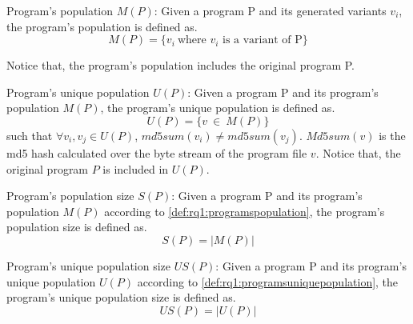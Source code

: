 
\begin{definition}{Program's population $M(P)$:}\label{def:rq1:programspopulation}
    Given a program P and its generated variants $v_i$, the program's population is defined as.\\
    $$
        M(P)=\{v_i\ \text{where $v_i$ is a variant of P}\}
    $$

    Notice that, the program's population includes the original program P.
\end{definition}




\begin{definition}{Program's unique population $U(P)$:}\label{def:rq1:programsuniquepopulation}
    Given a program P and its program's population $M(P)$, the program's unique population is defined as.\\
    $$
        U(P)=\{v\ \in\ M(P)\}
    $$
    such that $\forall v_i,v_j \in U(P)$, $md5sum(v_i) \neq md5sum(v_j)$.
    $Md5sum(v)$ is the md5 hash calculated over the byte stream of the program file $v$. Notice that, the original program $P$ is included in $U(P)$.

\end{definition}

\begin{metric}{Program's population size $S(P)$:}\label{metric:rq1:PS}
    Given a program P and its program's population $M(P)$ according to \autoref{def:rq1:programspopulation}, the program's population size is defined as.\\
    $$
        S(P)=|M(P)|
    $$
\end{metric}


\begin{metric}{Program's unique population size $US(P)$:}\label{metric:rq1:UP}
    Given a program P and its program's unique population $U(P)$ according to \autoref{def:rq1:programsuniquepopulation}, the program's unique population size is defined as.\\
    $$
        US(P)=|U(P)|
    $$
\end{metric}


